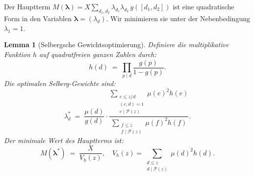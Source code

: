 \documentclass[12pt,a4paper]{amsart}
\newtheorem{lemma}[theorem]{Lemma}
\theoremstyle{definition}
\begin{document}
Der Hauptterm $M(\boldsymbol{\lambda}) = X \sum_{d_1,d_2} \lambda_{d_1}\lambda_{d_2}\, g([d_1,d_2])$
ist eine quadratische Form in den Variablen $\boldsymbol{\lambda} = (\lambda_d)$.
Wir minimieren sie unter der Nebenbedingung $\lambda_1 = 1$.

\begin{lemma}[Selbergsche Gewichtsoptimierung]\label{lem:optimierung}
  Definiere die multiplikative Funktion $h$ auf quadratfreien ganzen Zahlen durch:
  \[
    h(d) \;=\; \prod_{p \mid d} \frac{g(p)}{1 - g(p)}.
  \]
  Die optimalen Selberg-Gewichte sind:
  \[
    \lambda_d^* \;=\; \frac{\mu(d)}{g(d)} \cdot
      \frac{\displaystyle\sum_{\substack{e \leq z/d \\ (e,d)=1 \\ e \mid \mathcal{P}(z)}} \mu(e)^2 h(e)}
           {\displaystyle\sum_{\substack{f \leq z \\ f \mid \mathcal{P}(z)}} \mu(f)^2 h(f)}.
  \]
  Der minimale Wert des Hauptterms ist:
  \[
    M(\boldsymbol{\lambda}^*) \;=\; \frac{X}{V_h(z)},
    \quad
    V_h(z) = \sum_{\substack{d \leq z \\ d \mid \mathcal{P}(z)}} \mu(d)^2 h(d).
  \]
\end{lemma}
\end{document}
